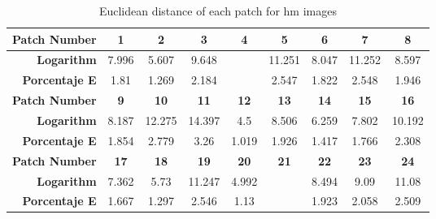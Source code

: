 \begin{table}[H]
  \caption{Euclidean distance of each patch for hm images }
  \begin{center}
    \begin{tabularx}{\textwidth}{r c c c c c c c c}
    \toprule
        \textbf{Patch Number} & \textbf{1} & \textbf{2} & \textbf{3} & \textbf{4} & \textbf{5} & \textbf{6} & \textbf{7} & \textbf{8}\\ \midrule 
        \textbf{Logarithm} &7.996 &5.607 &9.648 &\cellcolor{colorred}{15.072} &11.251 &8.047 &11.252 &8.597\\ 
        \textbf{Porcentaje E} &1.81 &1.269 &2.184 &\cellcolor{colorred}{3.412} &2.547 &1.822 &2.548 &1.946\\ \midrule 
        \textbf{Patch Number} & \textbf{9} & \textbf{10} & \textbf{11} & \textbf{12} & \textbf{13} & \textbf{14} & \textbf{15} & \textbf{16}\\ \midrule 
        \textbf{Logarithm} &8.187 &12.275 &14.397 &4.5 &8.506 &6.259 &7.802 &10.192\\ 
        \textbf{Porcentaje E} &1.854 &2.779 &3.26 &1.019 &1.926 &1.417 &1.766 &2.308\\ \midrule 
        \textbf{Patch Number} & \textbf{17} & \textbf{18} & \textbf{19} & \textbf{20} & \textbf{21} & \textbf{22} & \textbf{23} & \textbf{24}\\ \midrule 
        \textbf{Logarithm} &7.362 &5.73 &11.247 &4.992 &\cellcolor{colorgreen}{4.251} &8.494 &9.09 &11.08\\ 
        \textbf{Porcentaje E} &1.667 &1.297 &2.546 &1.13 &\cellcolor{colorgreen}{0.962} &1.923 &2.058 &2.509\\ \midrule 
    \bottomrule
    \end{tabularx}
  \end{center}
\end{table}

